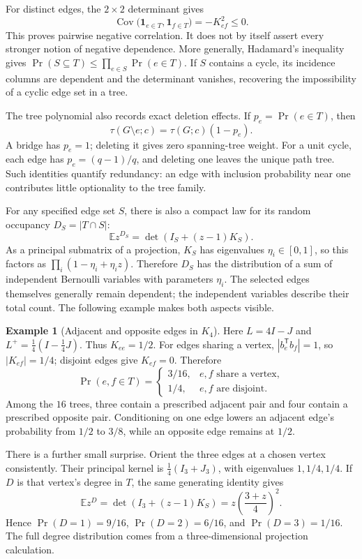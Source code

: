\documentclass[11pt]{article}
\theoremstyle{definition}
\newtheorem{example}[theorem]{Example}
\theoremstyle{remark}
\begin{document}
For distinct edges, the $2\times2$ determinant gives
\begin{equation}\label{eq:glin-negative-correlation}
 \operatorname{Cov}\bigl(\mathbf1_{e\in T},\mathbf1_{f\in T}\bigr)
 =-K_{ef}^2\le0.
\end{equation}
This proves pairwise negative correlation. It does not by itself assert every stronger notion of negative dependence. More generally, Hadamard's inequality gives $\Pr(S\subseteq T)\le\prod_{e\in S}\Pr(e\in T)$. If $S$ contains a cycle, its incidence columns are dependent and the determinant vanishes, recovering the impossibility of a cyclic edge set in a tree.

The tree polynomial also records exact deletion effects. If $p_e=\Pr(e\in T)$, then
\[
 \tau(G\setminus e;c)=\tau(G;c)(1-p_e).
\]
A bridge has $p_e=1$; deleting it gives zero spanning-tree weight. For a unit cycle, each edge has $p_e=(q-1)/q$, and deleting one leaves the unique path tree. Such identities quantify redundancy: an edge with inclusion probability near one contributes little optionality to the tree family.

For any specified edge set $S$, there is also a compact law for its random occupancy $D_S=|T\cap S|$:
\[
 \mathbb E z^{D_S}=\det(I_S+(z-1)K_S).
\]
As a principal submatrix of a projection, $K_S$ has eigenvalues $\eta_i\in[0,1]$, so this factors as $\prod_i(1-\eta_i+\eta_i z)$. Therefore $D_S$ has the distribution of a sum of independent Bernoulli variables with parameters $\eta_i$. The selected edges themselves generally remain dependent; the independent variables describe their total count. The following example makes both aspects visible.

\begin{example}[Adjacent and opposite edges in $K_4$]\label{ex:glin-k4}
Here $L=4I-J$ and $L^+=\tfrac14(I-\tfrac14J)$. Thus $K_{ee}=1/2$. For edges sharing a vertex, $|b_e^{\mathsf T}b_f|=1$, so $|K_{ef}|=1/4$; disjoint edges give $K_{ef}=0$. Therefore
\[
 \Pr(e,f\in T)=
 \begin{cases}
 3/16,&e,f\text{ share a vertex},\\
 1/4,&e,f\text{ are disjoint}.
 \end{cases}
\]
Among the $16$ trees, three contain a prescribed adjacent pair and four contain a prescribed opposite pair. Conditioning on one edge lowers an adjacent edge's probability from $1/2$ to $3/8$, while an opposite edge remains at $1/2$.

There is a further small surprise. Orient the three edges at a chosen vertex consistently. Their principal kernel is $\tfrac14(I_3+J_3)$, with eigenvalues $1,1/4,1/4$. If $D$ is that vertex's degree in $T$, the same generating identity gives
\[
 \mathbb E z^D=\det(I_3+(z-1)K_S)
 =z\left(\frac{3+z}{4}\right)^2.
\]
Hence $\Pr(D=1)=9/16$, $\Pr(D=2)=6/16$, and $\Pr(D=3)=1/16$. The full degree distribution comes from a three-dimensional projection calculation.
\end{example}
\end{document}

